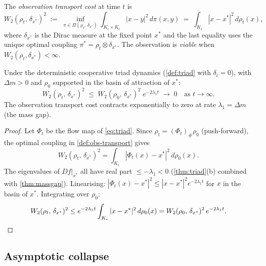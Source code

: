 \begin{definition}
\label{def:obs-transport}
The \emph{observation transport cost} at time $t$ is
\[
  W_2(\rho_t,\, \delta_{x^*})^2
  \;:=\;
  \inf_{\pi \in \Pi(\rho_t,\, \delta_{x^*})}
  \int_{K_\epsilon \times K_\epsilon}
  |x - y|^2\, d\pi(x, y)
  \;=\;
  \int_{K_\epsilon} |x - x^*|^2\, d\rho_t(x),
\]
where $\delta_{x^*}$ is the Dirac measure at the fixed point $x^*$
and the last equality uses the unique optimal coupling
$\pi^* = \rho_t \otimes \delta_{x^*}$.
The observation is \emph{viable} when
$W_2(\rho_t, \delta_{x^*}) < \infty$.
\end{definition}

\begin{proposition}
\label{prop:ot-contract}
Under the deterministic cooperative triad dynamics
(\cref{def:triad} with $\delta_i = 0$), with $\Delta m > 0$ and
$\rho_0$ supported in the basin of attraction of $x^*$:
\[
  W_2(\rho_t,\, \delta_{x^*})^2
  \;\leq\;
  W_2(\rho_0,\, \delta_{x^*})^2\; e^{-2\lambda_1 t}
  \;\to\; 0
  \quad \text{as } t \to \infty.
\]
The observation transport cost contracts exponentially to zero at
rate $\lambda_1 = \Delta m$ (the mass gap).
\end{proposition}

\begin{proof}
Let $\Phi_t$ be the flow map of \eqref{eq:triad}.
Since $\rho_t = (\Phi_t)_\# \rho_0$ (push-forward), the optimal
coupling in \cref{def:obs-transport} gives
\[
  W_2(\rho_t,\, \delta_{x^*})^2
  = \int_{K_\epsilon} |\Phi_t(x) - x^*|^2\, d\rho_0(x).
\]
The eigenvalues of $Df|_{x^*}$ all have real part
$\leq -\lambda_1 < 0$ (\cref{thm:triad}(b) combined with
\cref{thm:massgap}).  Linearising:
$|\Phi_t(x) - x^*|^2 \leq |x - x^*|^2 e^{-2\lambda_1 t}$
for $x$ in the basin of $x^*$.  Integrating over $\rho_0$:
\[
  W_2(\rho_t,\, \delta_{x^*})^2
  \leq e^{-2\lambda_1 t}
  \int_{K_\epsilon} |x - x^*|^2\, d\rho_0(x)
  = W_2(\rho_0,\, \delta_{x^*})^2\, e^{-2\lambda_1 t}.  \qedhere
\]
\end{proof}

\subsection{Asymptotic collapse}

